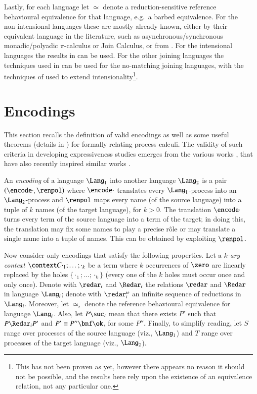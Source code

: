 \documentclass[submission,copyright,creativecommons]{eptcs}
\renewcommand{\beq}{\simeq}
\begin{document}
Lastly, for each language let $\beq$ denote
a reduction-sensitive reference behavioural equivalence for that language, e.g.~a barbed equivalence.
For the non-intensional languages these are mostly already known, either by
their equivalent language in the literature, such as asynchronous/synchronous monadic/polyadic
$\pi$-calculus or Join Calculus, or from \cite{G:IC08}.
For the intensional languages the results in \cite{GivenWilsonGorla13} can be used.
For the other joining languages the techniques used in \cite{Fournet99bisimulationsin} can be used for
the no-matching joining languages, with the techniques of \cite{GivenWilsonGorla13} used to extend
intensionality\footnote{This has not been proven as yet, however there appears no reason it should not be
possible, and the results here rely upon the existence of an equivalence relation, not any particular one.}.

\section{Encodings}
\label{sec:encoding}

This section recalls the definition of valid encodings as well as some
useful theorems (details in \cite{G:CONCUR08}) for formally relating process calculi.
The validity of such criteria in developing expressiveness studies emerges from the
various works \cite{G:IC08,G:DC10,G:CONCUR08}, that have also recently inspired similar works
\cite{LPSS10,Lanese:2010:EPP:2175486.2175506,gla12}. 

An {\em encoding} of a language $\Lang_1$ into another language $\Lang_2$ is a pair
$(\encode\cdot,\renpol)$ where $\encode\cdot$ translates every $\Lang_1$-process into
an $\Lang_2$-process and $\renpol$ maps every name (of the source language) into a tuple
of $k$ names (of the target language), for $k > 0$.
The translation $\encode\cdot$ turns every term of the source language into a term of the
target; in doing this, the translation may fix some names to play a precise r\^ole 
or may translate a single name into a tuple of names. This can be obtained
by exploiting $\renpol$.

Now consider only encodings that satisfy the following properties.
Let a {\em $k$-ary context} $\context C {\cdot_1; \ldots; \cdot_k}$ be a term where $k$
occurrences of $\zero$ are linearly replaced by the holes $\{\cdot_1;
\ldots; \cdot_k\}$ (every one of the $k$ holes must occur once and only once).
Denote with $\redar_i$ and $\Redar_i$ 
the relations $\redar$ and $\Redar$ in language $\Lang_i$;
denote with $\redar^\omega_i$ an infinite sequence of reductions in $\Lang_i$.
Moreover, let $\beq_i$ denote the reference behavioural equivalence for language $\Lang_i$.
Also, let $P \suc_i$ mean that there exists $P'$ such that $P \Redar_i P'$ and $P' \equiv P''\bnf \ok$,
for some $P''$.
Finally, to simplify reading, let $S$ range
over processes of the source language (viz., $\Lang_1$) and $T$ range
over processes of the target language (viz., $\Lang_2$).
\end{document}
